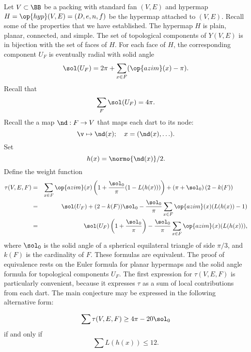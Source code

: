 Let $V\subset \BB$ be a packing with
standard fan $(V,E)$ and hypermap $H=\op{hyp}(V,E)=(D,e,n,f)$
be the hypermap attached to $(V,E)$.  Recall some of the properties that
we have established.
The hypermap $H$ is plain, planar, connected, and simple.
The set of topological components of $Y(V,E)$ is in bijection with
the set of faces of $H$.  
%
For each face of $H$, the corresponding component $U_F$
is eventually radial with solid
angle
%
\begin{displaymath}
\sol(U_F) = 2\pi + \sum_{x\in F} (\op{azim}(x) -\pi).
\end{displaymath}
Recall that
\begin{displaymath}\sum_{F} \sol(U_F) = 4\pi.\end{displaymath}
Recall the a map $\nd:F\to V$ that maps each dart to its node:
\begin{displaymath}
\v \mapsto \nd(x); \quad   x = (\nd(x),\ldots).
\end{displaymath}
Set 
\begin{displaymath}h(x) = \normo{\nd(x)}/2.\end{displaymath}
Define the weight function
\begin{eqnarray}
  \tau(V,E,F) &=&\sum_{x\in F} \op{azim}(x)
  \left(1 + \dfrac{\sol_0}{\pi}(1- L(h(x)))\right) 
  + \left(\pi+{\sol_0}\right) (2- k(F))\qquad\phantom{t}\vspace{6pt}\\
  &=& \sol(U_F) + (2- k(F))\sol_0 - \dfrac{\sol_0}{\pi}
\sum_{x\in F}\op{azim}(x) (L(h(x)) - 1)\vspace{6pt}\\
  &=& \sol(U_F) \left( 1 + \dfrac{\sol_0}{\pi}\right) 
- \dfrac{\sol_0}{\pi} \sum_{x\in F} \op{azim}(x)(L(h(x))),\label{eqn:tau-sol}
\end{eqnarray}
where $\sol_0$ is the solid angle of a spherical equilateral triangle
of side $\pi/3$, and $k(F)$ is the cardinality of $F$.
% 
These formulas are equivalent.  The proof of equivalence rests on the
Euler formula for planar hypermaps and the solid angle formula for
topological components $U_F$.  The first expression for $\tau(V,E,F)$
is particularly convenient, because it expresses $\tau$ as a sum of
local contributions from each dart.  %
%
%
The main conjecture may be expressed in the following alternative
form:

\begin{lemma}[]
\begin{displaymath}
\sum \tau (V,E,F) \ge 4\pi - 20\sol_0
\end{displaymath}
if and only if
\begin{displaymath}
\sum L(h(x)) \le 12.
\end{displaymath}
\end{lemma}


